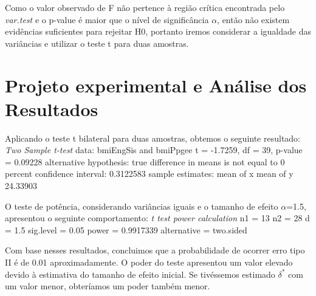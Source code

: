 \documentclass[12pt, a4paper]{article}
\begin{document}
\par Como o valor observado de F não pertence à região crítica encontrada pelo \textit{var.test} e o p-value é maior que o nível de significância $\alpha$, então não existem evidências suficientes para rejeitar H0, portanto iremos considerar a igualdade das variâncias e utilizar o teste t para duas amostras.

\section{Projeto experimental e Análise dos Resultados}
\label{sec:projeto-experimental}
Aplicando o teste t bilateral para duas amostras, obtemos o seguinte resultado:
\newline
\newline
\textit{Two Sample t-test} \newline
data:  bmiEngSis and bmiPpgee \newline
t = -1.7259, df = 39, p-value = 0.09228 \newline
alternative hypothesis: true difference in means is not equal to 0  percent confidence interval:   0.3122583 \newline
sample estimates: \newline
mean of x mean of y   24.33903 \newline
\par O teste de potência, considerando variâncias iguais e o tamanho de efeito $\alpha$=1.5, apresentou o seguinte comportamento:
\newline
\newline
\textit{t test power calculation } \newline
             n1 = 13 \newline
             n2 = 28 \newline
              d = 1.5 \newline
      sig.level = 0.05 \newline
          power = 0.9917339 \newline
    alternative = two.sided \newline

\par Com base nesses resultados, concluimos que a probabilidade de ocorrer erro tipo II é de 0.01 aproximadamente. O poder do teste apresentou um valor elevado devido à estimativa do tamanho de efeito inicial. Se tivéssemos estimado $\delta^*$ com um valor menor, obteríamos um poder também menor.
\end{document}
